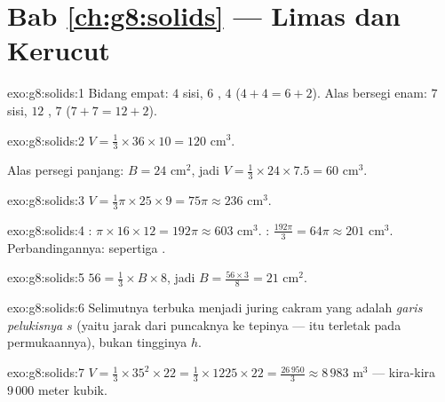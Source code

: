 \section*{Bab \ref{ch:g8:solids} --- Limas dan Kerucut}

\begin{solution}{exo:g8:solids:1}
Bidang empat: $4$ sisi, $6$ , $4$ 
($4 + 4 = 6 + 2$). Alas bersegi enam: $7$ sisi, $12$ , $7$
 ($7 + 7 = 12 + 2$).
\end{solution}

\begin{solution}{exo:g8:solids:2}
$V = \frac13 \times 36 \times 10 = 120$ cm$^3$.

Alas persegi panjang: $B = 24$ cm$^2$, jadi
$V = \frac13 \times 24 \times 7.5 = 60$ cm$^3$.
\end{solution}

\begin{solution}{exo:g8:solids:3}
$V = \frac13 \pi \times 25 \times 9 = 75\pi \approx 236$ cm$^3$.
\end{solution}

\begin{solution}{exo:g8:solids:4}
: $\pi \times 16 \times 12 = 192\pi \approx 603$ cm$^3$.
: $\frac{192\pi}{3} = 64\pi \approx 201$ cm$^3$.
Perbandingannya:  sepertiga .
\end{solution}

\begin{solution}{exo:g8:solids:5}
$56 = \frac13 \times B \times 8$, jadi $B = \frac{56 \times 3}{8} = 21$
cm$^2$.
\end{solution}

\begin{solution}{exo:g8:solids:6}
Selimutnya terbuka menjadi juring cakram yang  adalah
\emph{garis pelukisnya} $s$ (yaitu jarak dari puncaknya ke tepinya ---
 itu terletak pada permukaannya), bukan tingginya $h$.
\end{solution}

\begin{solution}{exo:g8:solids:7}
$V = \frac13 \times 35^2 \times 22 = \frac13 \times 1225 \times 22
= \frac{26\,950}{3} \approx 8\,983$ m$^3$ --- kira-kira $9\,000$ meter
kubik.
\end{solution}

